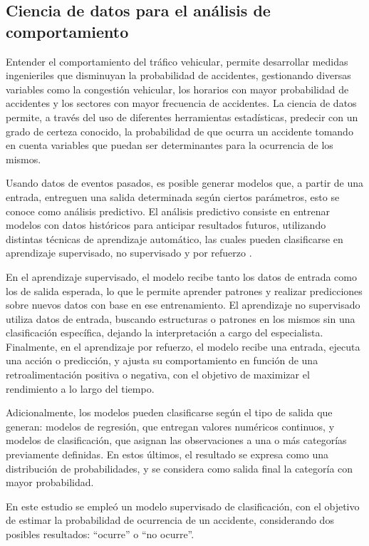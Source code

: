 \documentclass[12pt]{article}
\begin{document}
\subsection{Ciencia de datos para el análisis de comportamiento}

Entender el comportamiento del tráfico vehicular, permite desarrollar medidas ingenieriles que disminuyan la probabilidad de accidentes, gestionando diversas variables como la congestión vehicular, los horarios con mayor probabilidad de accidentes y los sectores con mayor frecuencia de accidentes. La ciencia de datos permite, a través del uso de diferentes herramientas estadísticas, predecir con un grado de certeza conocido, la probabilidad de que ocurra un accidente tomando en cuenta variables que puedan ser determinantes para la ocurrencia de los mismos.

Usando datos de eventos pasados, es posible generar modelos que, a partir de una entrada, entreguen una salida determinada según ciertos parámetros, esto se conoce como análisis predictivo. El análisis predictivo consiste en entrenar modelos con datos históricos para anticipar resultados futuros, utilizando distintas técnicas de aprendizaje automático, las cuales pueden clasificarse en aprendizaje supervisado, no supervisado y por refuerzo \parencite{murphy2012machine, geron2019hands, bishop2006pattern}.

En el aprendizaje supervisado, el modelo recibe tanto los datos de entrada como los de salida esperada, lo que le permite aprender patrones y realizar predicciones sobre nuevos datos con base en ese entrenamiento. El aprendizaje no supervisado utiliza datos de entrada, buscando estructuras o patrones en los mismos sin una clasificación específica, dejando la interpretación a cargo del especialista. Finalmente, en el aprendizaje por refuerzo, el modelo recibe una entrada, ejecuta una acción o predicción, y ajusta su comportamiento en función de una retroalimentación positiva o negativa, con el objetivo de maximizar el rendimiento a lo largo del tiempo.

Adicionalmente, los modelos pueden clasificarse según el tipo de salida que generan: modelos de regresión, que entregan valores numéricos continuos, y modelos de clasificación, que asignan las observaciones a una o más categorías previamente definidas. En estos últimos, el resultado se expresa como una distribución de probabilidades, y se considera como salida final la categoría con mayor probabilidad.

En este estudio se empleó un modelo supervisado de clasificación, con el objetivo de estimar la probabilidad de ocurrencia de un accidente, considerando dos posibles resultados: “ocurre” o “no ocurre”.
\end{document}
